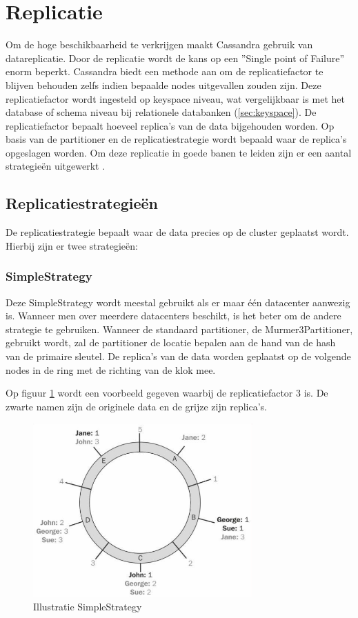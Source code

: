 \section{Replicatie}
\label{sec_replication}
Om de hoge beschikbaarheid te verkrijgen maakt Cassandra gebruik van datareplicatie.
Door de replicatie wordt de kans op een ''Single point of Failure'' enorm beperkt.
Cassandra biedt een methode aan om de replicatiefactor te blijven behouden zelfs indien bepaalde nodes uitgevallen zouden zijn.
Deze replicatiefactor wordt ingesteld op keyspace niveau, wat vergelijkbaar is met het database of schema niveau bij relationele databanken (\ref{sec:keyspace}).
De replicatiefactor bepaalt hoeveel replica's van de data bijgehouden worden.
Op basis van de partitioner en de replicatiestrategie wordt  bepaald waar de replica's opgeslagen worden.
Om deze replicatie in goede banen te leiden zijn er een aantal strategieën uitgewerkt \citep{kan2014cassandra}.

\subsection{Replicatiestrategieën}
De replicatiestrategie bepaalt waar de data precies op de cluster geplaatst wordt.
Hierbij zijn er twee strategieën:

\subsubsection{SimpleStrategy}
Deze SimpleStrategy wordt meestal gebruikt als er maar één datacenter aanwezig is.
Wanneer men over meerdere datacenters beschikt, is het beter om de andere strategie te gebruiken.
Wanneer de standaard partitioner, de Murmer3Partitioner, gebruikt wordt, zal de partitioner de locatie bepalen aan de hand van de hash van de primaire sleutel.
De replica's van de data worden geplaatst op de volgende nodes in de ring met de richting van de klok mee.
	
Op figuur \ref{fig:simple_strategy} wordt een voorbeeld gegeven waarbij de replicatiefactor 3 is.
De zwarte namen zijn de originele data en de grijze zijn replica's.
	
\begin{figure}[H]
	\centering
	\includegraphics[width=0.75\textwidth]{img/4_architectuur/SimpleStrategy}
	\caption{Illustratie SimpleStrategy \citep{strickland2014availability}}
	\label{fig:simple_strategy}
\end{figure}
	
